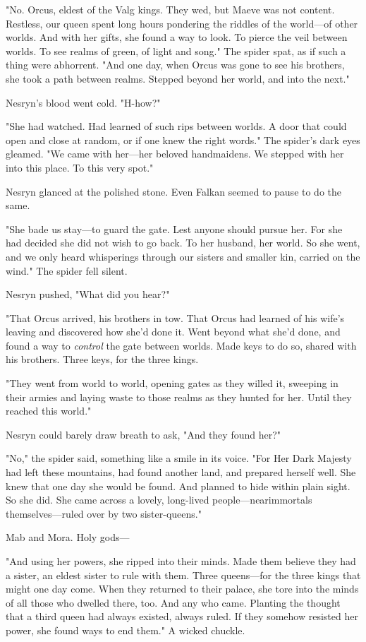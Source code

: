 "No. Orcus, eldest of the Valg kings. They wed, but Maeve was not content. Restless, our queen spent long hours pondering the riddles of the world---of other worlds. And with her gifts, she found a way to look. To pierce the veil between worlds. To see realms of green, of light and song." The spider spat, as if such a thing were abhorrent. "And one day, when Orcus was gone to see his brothers, she took a path between realms. Stepped beyond her world, and into the next."

Nesryn's blood went cold. "H-how?"

"She had watched. Had learned of such rips between worlds. A door that could open and close at random, or if one knew the right words." The spider's dark eyes gleamed. "We came with her---her beloved handmaidens. We stepped with her into this  place. To this very spot."

Nesryn glanced at the polished stone. Even Falkan seemed to pause to do the same.

"She bade us stay---to guard the gate. Lest anyone should pursue her. For she had decided she did not wish to go back. To her husband, her world. So she went, and we only heard whisperings through our sisters and smaller kin, carried on the wind." The spider fell silent.

Nesryn pushed, "What did you hear?"

"That Orcus arrived, his brothers in tow. That Orcus had learned of his wife's leaving and discovered how she'd done it. Went beyond what she'd done, and found a way to \emph{control} the gate between worlds. Made keys to do so, shared with his brothers. Three keys, for the three kings.

"They went from world to world, opening gates as they willed it, sweeping in their armies and laying waste to those realms as they hunted for her. Until they reached this world."

Nesryn could barely draw breath to ask, "And they found her?"

"No," the spider said, something like a smile in its voice. "For Her Dark Majesty had left these mountains, had found another land, and prepared herself well. She knew that one day she would be found. And planned to hide within plain sight. So she did. She came across a lovely, long-lived people---nearimmortals themselves---ruled over by two sister-queens."

Mab and Mora. Holy gods---

"And using her powers, she ripped into their minds. Made them believe they had a sister, an eldest sister to rule with them. Three queens---for the three kings that might one day come. When they returned to their palace, she tore into the minds of all those who dwelled there, too. And any who came. Planting the thought that a third queen had always existed, always ruled. If they somehow resisted her power, she found ways to end them." A wicked chuckle.

